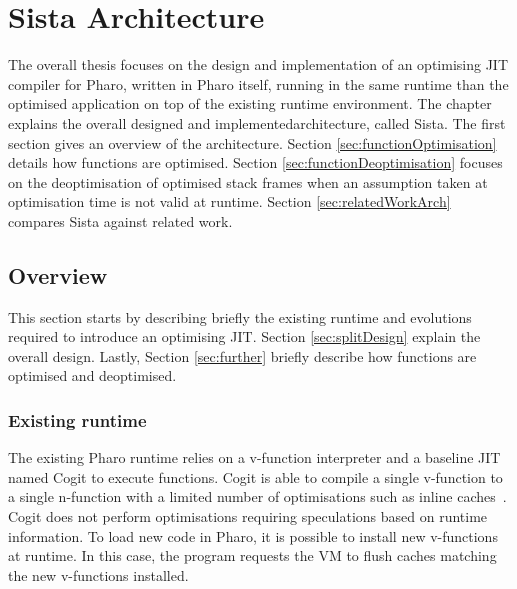 \documentclass[a4paper,12pt,twoside]{../includes/ThesisStyle}
\begin{document}
\fi

\chapter{Sista Architecture}
\label{chap:architecture}
\minitoc

The overall thesis focuses on the design and implementation of an optimising JIT compiler for Pharo, written in Pharo itself, running in the same runtime than the optimised application on top of the existing runtime environment. The chapter explains the overall designed and implementedarchitecture, called Sista. The first section gives an overview of the architecture. Section \ref{sec:functionOptimisation} details how functions are optimised. Section \ref{sec:functionDeoptimisation} focuses on the deoptimisation of optimised stack frames when an assumption taken at optimisation time is not valid at runtime. Section \ref{sec:relatedWorkArch} compares Sista against related work.


\section{Overview}

This section starts by describing briefly the existing runtime and evolutions required to introduce an optimising JIT. Section \ref{sec:splitDesign} explain the overall design. Lastly, Section \ref{sec:further} briefly describe how functions are optimised and deoptimised. 

\subsection{Existing runtime}

The existing Pharo runtime relies on a v-function interpreter and a baseline JIT named Cogit to execute functions. Cogit is able to compile a single v-function to a single n-function with a limited number of optimisations such as inline caches~\cite{Deut84a,Holz91a}. Cogit does not perform optimisations requiring speculations based on runtime information. To load new code in Pharo, it is possible to install new v-functions at runtime. In this case, the program requests the VM to flush caches matching the new v-functions installed.
\end{document}
